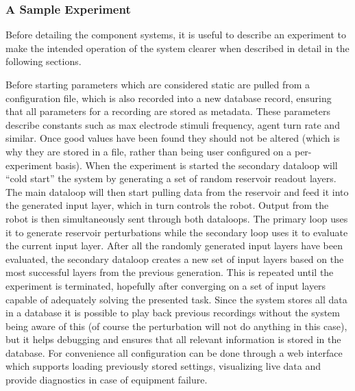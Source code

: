 \subsubsection{A Sample Experiment}
Before detailing the component systems, it is useful to describe an experiment to
make the intended operation of the system clearer when described in detail in
the following sections.\par
Before starting parameters which are considered static are pulled from a
configuration file, which is also recorded into a new database record, ensuring
that all parameters for a recording are stored as metadata.
These parameters describe constants such as max electrode stimuli frequency,
agent turn rate and similar.
Once good values have been found they should not be altered (which is why they
are stored in a file, rather than being user configured on a per-experiment
basis). 
When the experiment is started the secondary dataloop will ``cold start'' the
system by generating a set of random reservoir readout layers.
The main dataloop will then start pulling data from the reservoir and feed it
into the generated input layer, which in turn controls the robot.
Output from the robot is then simultaneously sent through both dataloops.
The
primary loop uses it to generate reservoir perturbations while the secondary
loop uses it to evaluate the current input layer.
After all the randomly generated input layers have been evaluated, the
secondary dataloop creates a new set of input layers based on the most
successful layers from the previous generation.
This is repeated until the experiment is terminated, hopefully after
converging on a set of input layers capable of adequately solving the presented
task.
Since the system stores all data in a database it is possible to play back
previous recordings without the system being aware of this (of course the
perturbation will not do anything in this case), but it helps debugging and
ensures that all relevant information is stored in the database.
For convenience all configuration can be done through a web interface which
supports loading previously stored settings, visualizing live data and provide
diagnostics in case of equipment failure. 
